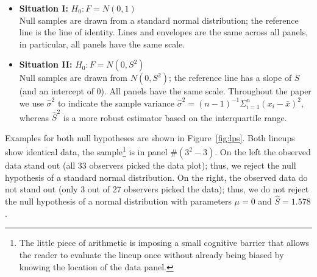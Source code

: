 \documentclass[12pt]{article}\usepackage[]{graphicx}\usepackage[]{color}
\newcommand{\alnote}[1]{\todo[inline,color=green!40]{#1}}
\begin{document}
\begin{itemize}
\item{\bf Situation I:}
$H_0: F = N(0,1)$  \\
Null samples are drawn from a standard normal distribution; the reference line is the line of identity. Lines and envelopes are the same across all panels, in particular, all panels have the same scale. 
\item{\bf Situation II:} $H_0: F = N(0,S^2)$ \\
Null samples are drawn from $N(0, S^2)$; the reference line has a slope of $S$ (and an intercept of 0).  All panels have the same scale. Throughout the paper we use $\hat{\sigma}^2$ to indicate the sample variance $\hat{\sigma}^2 = (n-1)^{-1} \Sigma_{i=1}^n (x_i - \bar{x})^2$, whereas $\hat{S}^2$ is a more robust estimator based on the interquartile range.
\end{itemize}


Examples for both null hypotheses are shown in Figure~\ref{fig:lps}. Both lineups show identical data, the sample\footnote{The little piece of arithmetic is imposing a small cognitive barrier that allows the reader to evaluate the lineup once without already being biased by knowing the location of the data panel.} is in panel \#$(3^2-3)$. On the left the observed data stand out (all 33 observers picked the data plot); thus, we reject the null hypothesis of a standard normal distribution. On the right, the observed data do not stand out (only 3 out of 27 observers picked the data); thus, we do not reject the null hypothesis of a normal distribution with parameters $\mu=0$ and $\widehat{S}=1.578$. 
\end{document}
